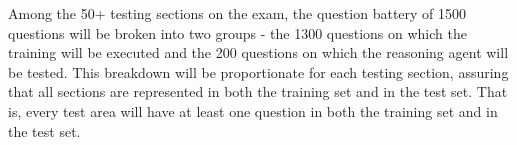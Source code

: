 Among the 50+ testing sections on the exam, the question battery of 1500 questions will be broken
into two groups - the 1300 questions on which the training will be executed and the 200 questions
on which the reasoning agent will be tested.  This breakdown will be proportionate for each testing
section, assuring that all sections are represented in both the training set and in the test set.  That is,
every test area will have at least one question in both the training set and in the test set.


















